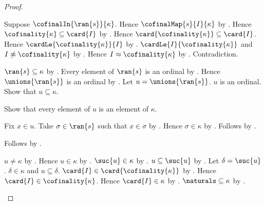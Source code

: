 \begin{proof}
\begin{byCase}
\begin{subproof}
                Suppose $\cofinalIn{\ran{s}}{\kappa}$.
                Hence $\cofinalMap{s}{I}{\kappa}$ by
                    .
                Hence $\cofinality{\kappa}\subseteq\card{I}$ by
                    .
                Hence $\card{\cofinality{\kappa}}\subseteq\card{I}$.
                Hence $\cardLe{\cofinality{\kappa}}{I}$ by
                    .
                $\cardLe{I}{\cofinality{\kappa}}$ and
                    $I\not\approx\cofinality{\kappa}$ by
                    .
                Hence $I\approx\cofinality{\kappa}$ by
                    .
                Contradiction.
            \end{subproof}
            $\ran{s}\subseteq\kappa$ by .
            Every element of $\ran{s}$ is an ordinal by
                .
            Hence $\unions{\ran{s}}$ is an ordinal by
                .
            Let $u=\unions{\ran{s}}$.
            $u$ is an ordinal.
            Show that $u\subseteq\kappa$.
            \begin{subproof}
                Show that every element of $u$ is an element of $\kappa$.
                \begin{subproof}
                    Fix $x\in u$.
                    Take $\sigma\in\ran{s}$ such that $x\in\sigma$ by
                        .
                    Hence $\sigma\in\kappa$ by .
                    Follows by .
                \end{subproof}
                Follows by .
            \end{subproof}
            $u\neq\kappa$ by
                .
            Hence $u\in\kappa$ by
                .
            $\suc{u}\in\kappa$ by .
            $u\subseteq\suc{u}$ by .
            Let $\delta=\suc{u}$.
            $\delta\in\kappa$ and $u\subseteq\delta$.
            $\card{I}\in\card{\cofinality{\kappa}}$ by
                .
            Hence $\card{I}\in\cofinality{\kappa}$.
            Hence $\card{I}\in\kappa$ by .
            $\naturals\subseteq\kappa$ by
                .

\end{byCase}
\end{proof}
